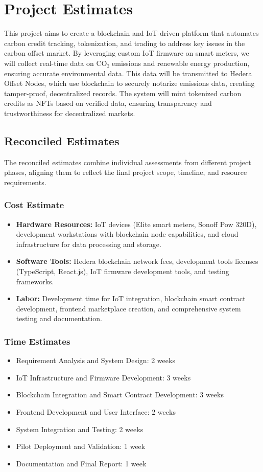 \documentclass[oneside,a4paper,12pt]{book}
\begin{document}
\newpage

\section{Project Estimates}
This project aims to create a blockchain and IoT-driven platform that automates carbon credit tracking, tokenization, and trading to address key issues in the carbon offset market. By leveraging custom IoT firmware on smart meters, we will collect real-time data on CO₂ emissions and renewable energy production, ensuring accurate environmental data. This data will be transmitted to Hedera Offset Nodes, which use blockchain to securely notarize emissions data, creating tamper-proof, decentralized records. The system will mint tokenized carbon credits as NFTs based on verified data, ensuring transparency and trustworthiness for decentralized markets.

\subsection{Reconciled Estimates}
The reconciled estimates combine individual assessments from different project phases, aligning them to reflect the final project scope, timeline, and resource requirements.

\subsubsection{Cost Estimate}
\begin{itemize}
    \item \textbf{Hardware Resources:} IoT devices (Elite smart meters, Sonoff Pow 320D), development workstations with blockchain node capabilities, and cloud infrastructure for data processing and storage.
    \item \textbf{Software Tools:} Hedera blockchain network fees, development tools licenses (TypeScript, React.js), IoT firmware development tools, and testing frameworks.
    \item \textbf{Labor:} Development time for IoT integration, blockchain smart contract development, frontend marketplace creation, and comprehensive system testing and documentation.
\end{itemize}

\subsubsection{Time Estimates}
\begin{itemize}
\item Requirement Analysis and System Design: 2 weeks
\item IoT Infrastructure and Firmware Development: 3 weeks  
\item Blockchain Integration and Smart Contract Development: 3 weeks
\item Frontend Development and User Interface: 2 weeks
\item System Integration and Testing: 2 weeks
\item Pilot Deployment and Validation: 1 week
\item Documentation and Final Report: 1 week
\end{itemize}
\end{document}
